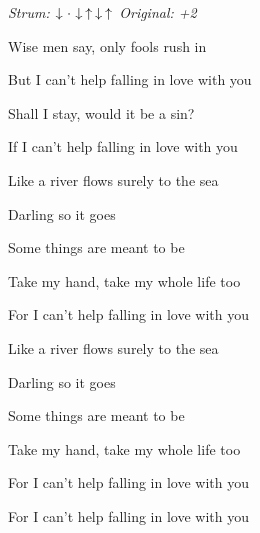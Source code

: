 \begin{song}


\begin{headerbox}
 \quad
\textit{Strum:} $\Down\Miss\Down\Up\Down\Up$ \quad
\textit{Original: +2}
\end{headerbox}

\begin{hchordbox}
\end{hchordbox}

\Large

\bigskip

Wise men say, only fools rush in \par
But I can't help falling in love with you 

\bigskip

Shall I stay, would it be a sin? \par
If I can't help falling in love with you 

\bigskip

Like a river flows surely to the sea \par
{}Darling so it goes \par
{}Some things  are meant to be 

\bigskip

Take my hand, take my whole life too \par
For I can't help falling in love with you 

\bigskip

Like a river flows surely to the sea \par
{}Darling so it goes \par
{}Some things  are meant to be 

\bigskip

Take my hand, take my whole life too \par
For I can't help falling in love with you \par
For I can't help falling in love with you \par

\end{song}